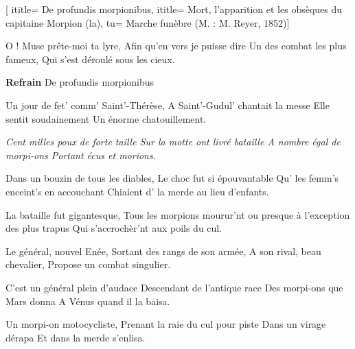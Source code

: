  [
ititle= {De profundis morpionibus},
ititle= {Mort, l'apparition et les obsèques du capitaine Morpion (la)},
tu= {Marche funèbre (M. : M. Reyer, 1852)}]


\beginverse
O ! Muse prête-moi ta lyre,
Afin qu'en vers je puisse dire
Un des combat les plus fameux,
Qui s'est déroulé sous les cieux.
\endverse

\beginchorus
\textbf {Refrain}
De profundis morpionibus
\endchorus

\beginverse
Un jour de fet' comm' Saint'-Thérèse,
A Saint'-Gudul' chantait la messe
Elle sentit soudainement
Un énorme chatouillement.
\endverse

\beginverse
\textit {Cent milles poux de forte taille
Sur la motte ont livré bataille
A nombre égal de morpi-ons
Portant écus et morions.}
\endverse

\beginverse
Dans un bouzin de tous les diables,
Le choc fut si épouvantable
Qu' les femm's enceint's en accouchant
Chiaient d' la merde au lieu d'enfants.
\endverse

\beginverse
La bataille fut gigantesque,
Tous les morpions mourur'nt ou presque
à l'exception des plus trapus
Qui s'accrochèr'nt aux poils du cul.
\endverse

\beginverse
Le général, nouvel Enée,
Sortant des rangs de son armée,
A son rival, beau chevalier,
Propose un combat singulier.
\endverse

\beginverse
C'est un général plein d'audace
Descendant de l'antique race
Des morpi-ons que Mars donna
A Vénus quand il la baisa.
\endverse

\beginverse
Un morpi-on motocycliste,
Prenant la raie du cul pour piste
Dans un virage dérapa
Et dans la merde s'enlisa.
\endverse

